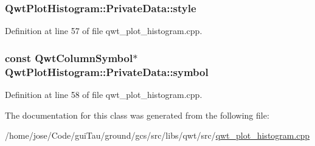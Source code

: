 \hypertarget{class_qwt_plot_histogram_1_1_private_data_a555a4f54bbf403dacab01a932c3a0963}{
\subsubsection[{style}]{ Qwt\-Plot\-Histogram\-::\-Private\-Data\-::style}}\label{class_qwt_plot_histogram_1_1_private_data_a555a4f54bbf403dacab01a932c3a0963}


Definition at line 57 of file qwt\-\_\-plot\-\_\-histogram.\-cpp.

\hypertarget{class_qwt_plot_histogram_1_1_private_data_adfcb3fcd4a8f8baec68bbe7c224f72a8}{
\subsubsection[{symbol}]{\setlength{\rightskip}{0pt plus 5cm}const {\bf Qwt\-Column\-Symbol}$\ast$ Qwt\-Plot\-Histogram\-::\-Private\-Data\-::symbol}}\label{class_qwt_plot_histogram_1_1_private_data_adfcb3fcd4a8f8baec68bbe7c224f72a8}


Definition at line 58 of file qwt\-\_\-plot\-\_\-histogram.\-cpp.



The documentation for this class was generated from the following file\-:\begin{DoxyCompactItemize}
\item 
/home/jose/\-Code/gui\-Tau/ground/gcs/src/libs/qwt/src/\hyperlink{qwt__plot__histogram_8cpp}{qwt\-\_\-plot\-\_\-histogram.\-cpp}\end{DoxyCompactItemize}
